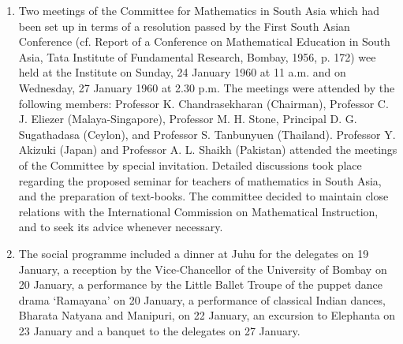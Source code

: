 \begin{enumerate}
\item Two meetings of the Committee for Mathematics in South Asia
  which had been set up in terms of a resolution passed by the First
  South Asian Conference (cf. Report of a Conference on Mathematical
  Education in South Asia, Tata Institute of Fundamental Research,
  Bombay, 1956, p. 172) wee held at the Institute on Sunday, 24
  January 1960 at 11 a.m. and on Wednesday, 27 January 1960 at 2.30
  p.m. The meetings were attended by the following members:  Professor
  K. Chandrasekharan (Chairman), Professor C. J. Eliezer
  (Malaya-Singapore), Professor M. H. Stone, Principal
  D. G. Sugathadasa (Ceylon), and Professor S. Tanbunyuen
  (Thailand). Professor Y. Akizuki (Japan) and Professor A. L. Shaikh
  (Pakistan) attended the meetings of the Committee by special
  invitation. Detailed discussions took place regarding the proposed
  seminar for teachers of mathematics in South Asia, and the
  preparation of text-books. The committee decided to maintain close
  relations with the International Commission on Mathematical
  Instruction, and to seek its advice whenever necessary. 

\item The social programme included a dinner at Juhu for the delegates
  on 19 January, a reception by the Vice-Chancellor of the University
  of Bombay on 20 January, a performance by the Little Ballet Troupe
  of the puppet dance drama `Ramayana' on 20 January, a performance of
  classical Indian dances, Bharata Natyana and Manipuri, on 22
  January, an excursion to Elephanta on 23 January and a banquet to
  the delegates on 27 January.
\end{enumerate}


